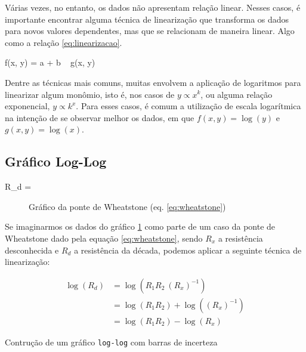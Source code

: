 Várias vezes, no entanto, os dados não apresentam relação linear. Nesses casos, é importante encontrar alguma técnica de linearização que transforma os dados para novos valores dependentes, mas que se relacionam de maneira linear. Algo como a relação \ref{eq:linearizacao}.

\begin{equacao} \label{eq:linearizacao}
    f(x, y) = a + b ~ g(x, y)
\end{equacao}

Dentre as técnicas mais comuns, muitas envolvem a aplicação de logaritmos para linearizar algum monômio, isto é, nos casos de $y \propto x^k$, ou alguma relação exponencial, $y \propto k^x$. Para esses casos, é comum a utilização de escala logarítmica na intenção de se observar melhor os dados, em que $f(x, y) = \log(y)$ e $g(x, y) = \log(x)$.


\subsection{Gráfico Log-Log} \label{sec:escala:loglog}

    \begin{equacao} \label{eq:wheatstone}
        R_d = 
    \end{equacao}

    \begin{figure}[H]
        \centering
        

        \caption{Gráfico da ponte de Wheatstone (eq. \ref{eq:wheatstone})}
        \label{fig:escala:loglog:dados}
    \end{figure}

    Se imaginarmos os dados do gráfico \ref{fig:escala:loglog:dados} como parte de um caso da ponte de Wheatstone dado pela equação \ref{eq:wheatstone}, sendo $R_x$ a resistência desconhecida e $R_d$ a resistência da década, podemos aplicar a seguinte técnica de linearização:

    \begin{align*}
        \log(R_d)
            &= \log\left(R_1 R_2 ~ (R_x)^{-1}\right) \\
            &= \log(R_1 R_2) + \log\left((R_x)^{-1}\right) \\
            &= \log(R_1 R_2) - \log(R_x)
    \end{align*}

    \begin{listing}[H]
        \caption{Contrução de um gráfico \texttt{log-log} com barras de incerteza}
        \label{code:escala:loglog}

    \end{listing}

